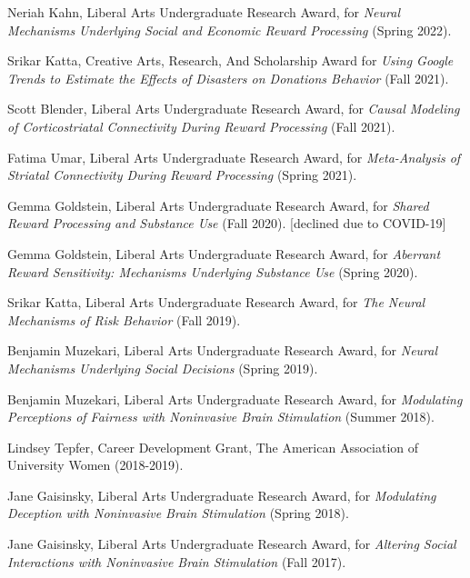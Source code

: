 \documentclass[11pt, letterpaper]{article}
\begin{document}
\begin{hangparas}{.5in}{1}

Neriah Kahn, Liberal Arts Undergraduate Research Award, for \textit{Neural Mechanisms Underlying Social and Economic Reward Processing} (Spring 2022).

Srikar Katta, Creative Arts, Research, And Scholarship Award for \textit{Using Google Trends to Estimate the Effects of Disasters on Donations Behavior} (Fall 2021).

Scott Blender, Liberal Arts Undergraduate Research Award, for \textit{Causal Modeling of Corticostriatal Connectivity During Reward Processing} (Fall 2021).

Fatima Umar, Liberal Arts Undergraduate Research Award, for \textit{Meta-Analysis of Striatal Connectivity During Reward Processing} (Spring 2021).

Gemma Goldstein, Liberal Arts Undergraduate Research Award, for \textit{Shared Reward Processing and Substance Use} (Fall 2020). [declined due to COVID-19]

Gemma Goldstein, Liberal Arts Undergraduate Research Award, for \textit{Aberrant Reward Sensitivity: Mechanisms Underlying Substance Use} (Spring 2020). 

Srikar Katta, Liberal Arts Undergraduate Research Award, for \textit{The Neural Mechanisms of Risk Behavior} (Fall 2019).

Benjamin Muzekari, Liberal Arts Undergraduate Research Award, for \textit{Neural Mechanisms Underlying Social Decisions} (Spring 2019).

Benjamin Muzekari, Liberal Arts Undergraduate Research Award, for \textit{Modulating Perceptions of Fairness with Noninvasive Brain Stimulation} (Summer 2018).

Lindsey Tepfer, Career Development Grant, The American Association of University Women (2018-2019).

Jane Gaisinsky, Liberal Arts Undergraduate Research Award, for \textit{Modulating Deception with Noninvasive Brain Stimulation} (Spring 2018).

Jane Gaisinsky, Liberal Arts Undergraduate Research Award, for \textit{Altering Social Interactions with Noninvasive Brain Stimulation} (Fall 2017). \\

\end{hangparas}



\vspace{.2cm}
\end{document}
